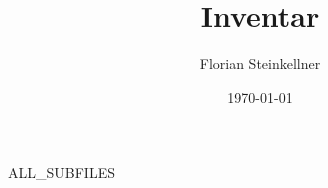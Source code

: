 \documentclass{article}
\title{Inventar}
\author{Florian Steinkellner}
\date{\today}
\begin{document}
\maketitle

ALL_SUBFILES
\end{document}
